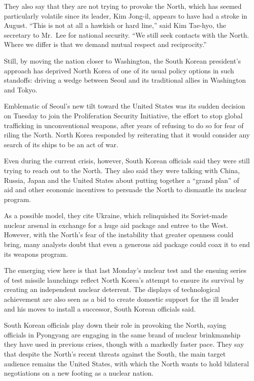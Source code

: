 \documentclass[12pt,a4paper,onecolumn]{article}
\begin{document}
They also say that they are not trying to provoke the North, which has seemed particularly volatile
since its leader, Kim Jong-il, appears to have had a stroke in August. ``This is not at all a
hawkish or hard line,'' said Kim Tae-hyo, the secretary to Mr.~Lee for national security. ``We still
seek contacts with the North. Where we differ is that we demand mutual respect and reciprocity.''

Still, by moving the nation closer to Washington, the South Korean president's approach has deprived
North Korea of one of its usual policy options in such standoffs: driving a wedge between Seoul and
its traditional allies in Washington and Tokyo.

Emblematic of Seoul's new tilt toward the United States was its sudden decision on Tuesday to join
the Proliferation Security Initiative, the effort to stop global trafficking in unconventional
weapons, after years of refusing to do so for fear of riling the North. North Korea responded by
reiterating that it would consider any search of its ships to be an act of war.

Even during the current crisis, however, South Korean officials said they were still trying to reach
out to the North. They also said they were talking with China, Russia, Japan and the United States
about putting together a ``grand plan'' of aid and other economic incentives to persuade the North
to dismantle its nuclear program.

As a possible model, they cite Ukraine, which relinquished its Soviet-made nuclear arsenal in
exchange for a huge aid package and entree to the West. However, with the North's fear of the
instability that greater openness could bring, many analysts doubt that even a generous aid package
could coax it to end its weapons program.

The emerging view here is that last Monday's nuclear test and the ensuing series of test missile
launchings reflect North Korea's attempt to ensure its survival by creating an independent nuclear
deterrent. The displays of technological achievement are also seen as a bid to create domestic
support for the ill leader and his moves to install a successor, South Korean officials said.

South Korean officials play down their role in provoking the North, saying officials in Pyongyang
are engaging in the same brand of nuclear brinkmanship they have used in previous crises, though
with a markedly faster pace. They say that despite the North's recent threats against the South, the
main target audience remains the United States, with which the North wants to hold bilateral
negotiations on a new footing as a nuclear nation.
\end{document}
